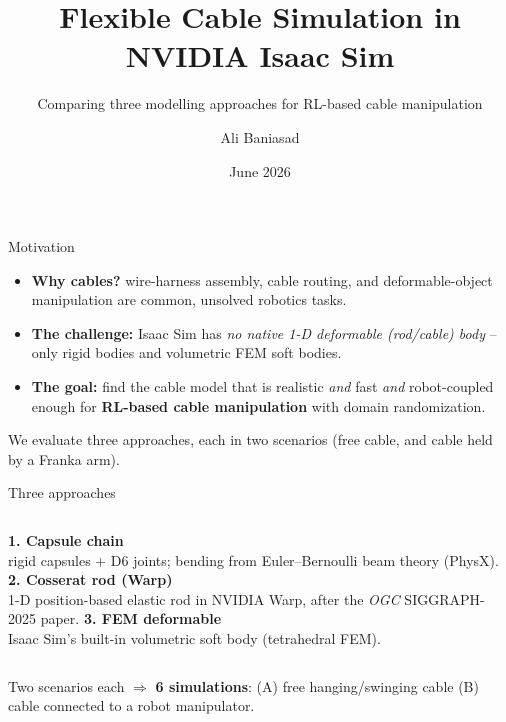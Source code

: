 \documentclass[aspectratio=169]{beamer}
\title[Cable Simulation in Isaac Sim]{Flexible Cable Simulation in NVIDIA Isaac Sim}
\subtitle{Comparing three modelling approaches for RL-based cable manipulation}
\author[A. Baniasad]{Ali Baniasad}
\institute[U. Waterloo]{Supervisor: Prof.\ Soo Jeon \\ University of Waterloo}
\date{June 2026}
\begin{document}
\begin{frame}[plain]\titlepage\end{frame}

\begin{frame}{Motivation}
  \begin{itemize}
    \item \textbf{Why cables?} wire-harness assembly, cable routing, and
          deformable-object manipulation are common, unsolved robotics tasks.
    \item \textbf{The challenge:} Isaac Sim has \emph{no native 1-D deformable
          (rod/cable) body} -- only rigid bodies and volumetric FEM soft bodies.
    \item \textbf{The goal:} find the cable model that is realistic \emph{and}
          fast \emph{and} robot-coupled enough for \textbf{RL-based cable
          manipulation} with domain randomization.
  \end{itemize}
  \vfill
  {\footnotesize We evaluate three approaches, each in two scenarios
   (free cable, and cable held by a Franka arm).}
\end{frame}

\begin{frame}{Three approaches}
  \begin{columns}[t]
    \centering
      \textbf{1. Capsule chain}\\\smallskip
      {\footnotesize rigid capsules + D6 joints; bending from Euler--Bernoulli
       beam theory (PhysX).}
    \centering
      \textbf{2. Cosserat rod (Warp)}\\\smallskip
      {\footnotesize 1-D position-based elastic rod in NVIDIA Warp, after the
       \emph{OGC} SIGGRAPH-2025 paper.}
    \centering
      \textbf{3. FEM deformable}\\\smallskip
      {\footnotesize Isaac Sim's built-in volumetric soft body (tetrahedral FEM).}
  \end{columns}
  \vfill
  \begin{center}\footnotesize
  Two scenarios each $\Rightarrow$ \textbf{6 simulations}:
  (A) free hanging/swinging cable \quad (B) cable connected to a robot manipulator.
  \end{center}
\end{frame}
\end{document}
